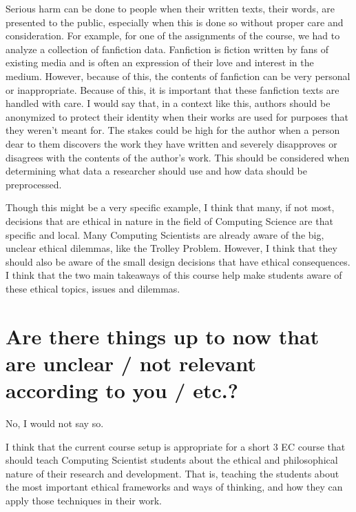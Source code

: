 \documentclass{IEEEtran}
\begin{document}
Serious harm can be done to people when their written texts, their words, are presented to the public, especially when this is done so without proper care and consideration.
For example, for one of the assignments of the course, we had to analyze a collection of fanfiction data.
Fanfiction is fiction written by fans of existing media and is often an expression of their love and interest in the medium.
However, because of this, the contents of fanfiction can be very personal or inappropriate.
Because of this, it is important that these fanfiction texts are handled with care.
I would say that, in a context like this, authors should be anonymized to protect their identity when their works are used for purposes that they weren't meant for.
The stakes could be high for the author when a person dear to them discovers the work they have written and severely disapproves or disagrees with the contents of the author's work.
This should be considered when determining what data a researcher should use and how data should be preprocessed.

Though this might be a very specific example, I think that many, if not most, decisions that are ethical in nature in the field of Computing Science are that specific and local.
Many Computing Scientists are already aware of the big, unclear ethical dilemmas, like the Trolley Problem.
However, I think that they should also be aware of the small design decisions that have ethical consequences.
I think that the two main takeaways of this course help make students aware of these ethical topics, issues and dilemmas.

\section*{Are there things up to now that are unclear / not relevant according to you / etc.?}
No, I would not say so.

I think that the current course setup is appropriate for a short 3 EC course that should teach Computing Scientist students about the ethical and philosophical nature of their research and development.
That is, teaching the students about the most important ethical frameworks and ways of thinking, and how they can apply those techniques in their work.

\end{document}
